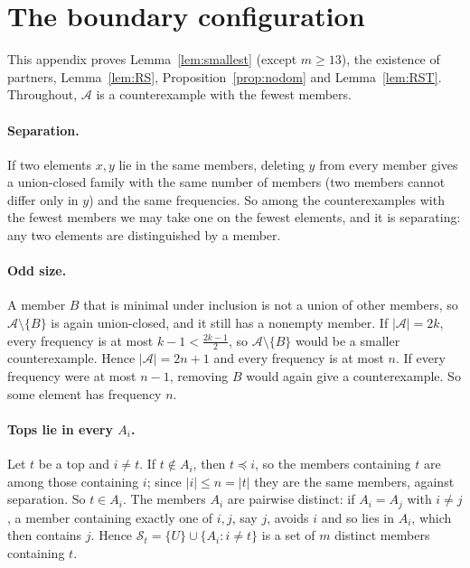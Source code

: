 \documentclass[12pt]{article}
\theoremstyle{plain}
\newcommand{\cA}{\mathcal{A}}
\begin{document}
\section{The boundary configuration}\label{app:boundary}

This appendix proves Lemma~\ref{lem:smallest} (except $m\ge13$), the existence of partners, Lemma~\ref{lem:RS}, Proposition~\ref{prop:nodom} and Lemma~\ref{lem:RST}. Throughout, $\cA$ is a counterexample with the fewest members.

\paragraph*{Separation.} If two elements $x,y$ lie in the same members, deleting $y$ from every member gives a union-closed family with the same number of members (two members cannot differ only in $y$) and the same frequencies. So among the counterexamples with the fewest members we may take one on the fewest elements, and it is separating: any two elements are distinguished by a member.

\paragraph*{Odd size.} A member $B$ that is minimal under inclusion is not a union of other members, so $\cA\setminus\{B\}$ is again union-closed, and it still has a nonempty member. If $|\cA|=2k$, every frequency is at most $k-1<\frac{2k-1}{2}$, so $\cA\setminus\{B\}$ would be a smaller counterexample. Hence $|\cA|=2n+1$ and every frequency is at most $n$. If every frequency were at most $n-1$, removing $B$ would again give a counterexample. So some element has frequency $n$.

\paragraph*{Tops lie in every $A_i$.} Let $t$ be a top and $i\neq t$. If $t\notin A_i$, then $t\preceq i$, so the members containing $t$ are among those containing $i$; since $|i|\le n=|t|$ they are the same members, against separation. So $t\in A_i$. The members $A_i$ are pairwise distinct: if $A_i=A_j$ with $i\ne j$, a member containing exactly one of $i,j$, say $j$, avoids $i$ and so lies in $A_i$, which then contains $j$. Hence $\mathcal S_t=\{U\}\cup\{A_i:i\ne t\}$ is a set of $m$ distinct members containing $t$.
\end{document}
